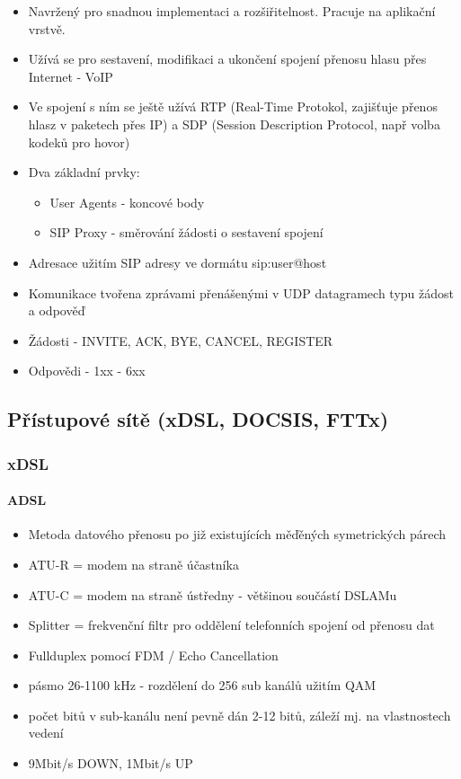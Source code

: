 \documentclass[10pt,a4paper]{article}
\begin{document}
\begin{itemize}
\item Navržený pro snadnou implementaci a rozšiřitelnost. Pracuje na aplikační vrstvě.
\item Užívá se pro sestavení, modifikaci a ukončení spojení přenosu hlasu přes Internet - VoIP
\item Ve spojení s ním se ještě užívá RTP (Real-Time Protokol, zajišťuje přenos hlasz v paketech přes IP) a SDP (Session Description Protocol, např volba kodeků pro hovor)
\item Dva základní prvky:
\begin{itemize}
\item User Agents - koncové body
\item SIP Proxy - směrování žádosti o sestavení spojení
\end{itemize}
\item Adresace užitím SIP adresy ve dormátu sip:user@host
\item Komunikace tvořena zprávami přenášenými v UDP datagramech typu žádost a odpověď
\item Žádosti - INVITE, ACK, BYE, CANCEL, REGISTER
\item Odpovědi - 1xx - 6xx
\end{itemize}

\subsection{Přístupové sítě (xDSL, DOCSIS, FTTx)}
\subsubsection{xDSL}
\paragraph{ADSL}
\begin{itemize}
\item Metoda datového přenosu po již existujících měďěných symetrických párech
\item ATU-R = modem na straně účastníka
\item ATU-C = modem na straně ústředny - většinou součástí DSLAMu
\item Splitter = frekvenční filtr pro oddělení telefonních spojení od přenosu dat
\item Fullduplex pomocí FDM / Echo Cancellation
\item pásmo 26-1100 kHz - rozdělení do 256 sub kanálů užitím QAM
\item počet bitů v sub-kanálu není pevně dán 2-12 bitů, záleží mj. na vlastnostech vedení
\item 9Mbit/s DOWN, 1Mbit/s UP
\end{itemize}
\end{document}
